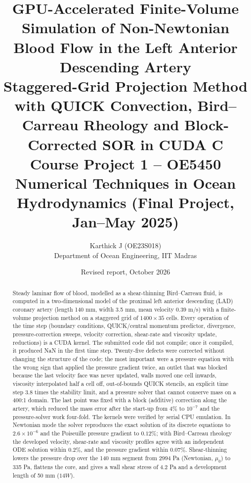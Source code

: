 
\usepackage{longtable}
\title{\textbf{GPU-Accelerated Finite-Volume Simulation of Non-Newtonian Blood Flow in the Left Anterior Descending Artery}\\[2pt]\large Staggered-Grid Projection Method with QUICK Convection, Bird--Carreau Rheology and Block-Corrected SOR in CUDA C\\[2pt]\normalsize Course Project 1 -- OE5450 Numerical Techniques in Ocean Hydrodynamics (Final Project, Jan--May 2025)}
\author{Karthick J (OE23S018)\\Department of Ocean Engineering, IIT Madras}
\date{Revised report, October 2026}
\maketitle
\begin{abstract}
Steady laminar flow of blood, modelled as a shear-thinning Bird--Carreau fluid, is computed in a two-dimensional model of the proximal left anterior descending (LAD) coronary artery (length 140 mm, width 3.5 mm, mean velocity 0.39 m/s) with a finite-volume projection method on a staggered grid of $1400\times35$ cells. Every operation of the time step (boundary conditions, QUICK/central momentum predictor, divergence, pressure-correction sweeps, velocity correction, shear-rate and viscosity update, reductions) is a CUDA kernel. The submitted code did not compile; once it compiled, it produced NaN in the first time step. Twenty-five defects were corrected without changing the structure of the code; the most important were a pressure equation with the wrong sign that applied the pressure gradient twice, an outlet that was blocked because the last velocity face was never updated, walls moved one cell inwards, viscosity interpolated half a cell off, out-of-bounds QUICK stencils, an explicit time step 3.8 times the stability limit, and a pressure solver that cannot conserve mass on a 400:1 domain. The last point was fixed with a block (additive) correction along the artery, which reduced the mass error after the start-up from 4\% to $10^{-7}$ and the pressure-solver work four-fold. The kernels were verified by serial CPU emulation. In Newtonian mode the solver reproduces the exact solution of its discrete equations to $2.6\times10^{-6}$ and the Poiseuille pressure gradient to $0.12\%$; with Bird--Carreau rheology the developed velocity, shear-rate and viscosity profiles agree with an independent ODE solution within $0.2\%$, and the pressure gradient within $0.07\%$. Shear-thinning lowers the pressure drop over the 140 mm segment from 2994 Pa (Newtonian, $\mu_0$) to 335 Pa, flattens the core, and gives a wall shear stress of 4.2 Pa and a development length of 50 mm ($14W$).
\end{abstract}
\tableofcontents\newpage

